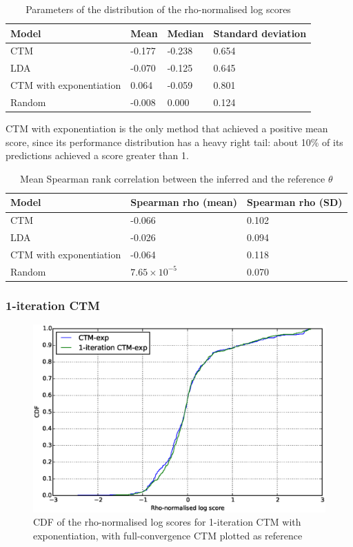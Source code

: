\documentclass[12pt,a4paper,twoside,openright]{report}
\begin{document}
\begin{table}
\begin{tabular}{| l | l | l | l |}
\hline
Model & Mean & Median & Standard deviation\\
\hline
CTM & -0.177 & -0.238 & 0.654 \\
LDA & -0.070 & -0.125 & 0.645 \\
CTM with exponentiation & 0.064 & -0.059 & 0.801 \\
Random & -0.008 & 0.000 & 0.124 \\
\hline
\end{tabular}
\caption{Parameters of the distribution of the rho-normalised log scores}
\label{tab:ctm-cdf-summary}
\end{table}

CTM with exponentiation is the only method that achieved a positive mean score, since its performance distribution has a heavy right tail: about 10\% of its predictions achieved a score greater than 1.

\begin{table}
\begin{tabular}{| l | l | l |}
\hline
Model & Spearman rho (mean) & Spearman rho (SD) \\
\hline
CTM & -0.066 & 0.102\\
LDA & -0.026 & 0.094\\
CTM with exponentiation & -0.064 & 0.118 \\
Random & $7.65 \times 10^{-5}$ & 0.070 \\
\hline
\end{tabular}
\caption{Mean Spearman rank correlation between the inferred and the reference $\theta$}
\label{tab:ctd-spearman}
\end{table}

\subsubsection{1-iteration CTM}

\begin{figure}[!htb]
\includegraphics[width=\textwidth]{ctd-ctm-1iter-rho.eps}
\caption{CDF of the rho-normalised log scores for 1-iteration CTM with exponentiation, with full-convergence CTM plotted as reference}
\label{fig:ctd-ctm-1iter-rho}
\end{figure}
\end{document}
